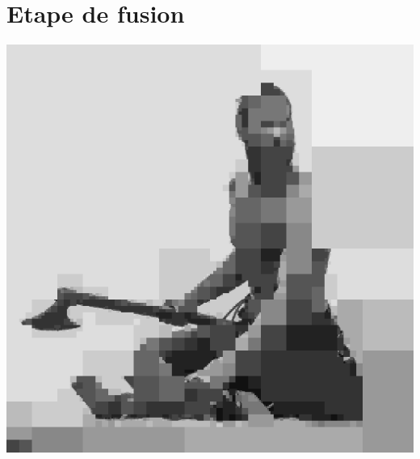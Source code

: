 \documentclass[a4paper,11pt]{article}
\begin{document}
\newpage
\section{Etape de fusion}
\begin{center}
\includegraphics[scale=0.6]{rolloRecTraf.png}
\end{center}
\end{document}
